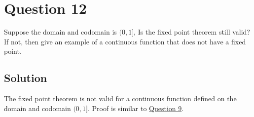 \section*{Question 12}

Suppose the domain and codomain is \( (0,1] \), Is the fixed point theorem still valid?
If not, then give an example of a continuous function that does not have a fixed point.

\subsection*{Solution}

The fixed point theorem is not valid for a continuous function defined on the domain and codomain \( (0,1] \).
Proof is similar to \hyperref[sec:q9]{Question 9}.
